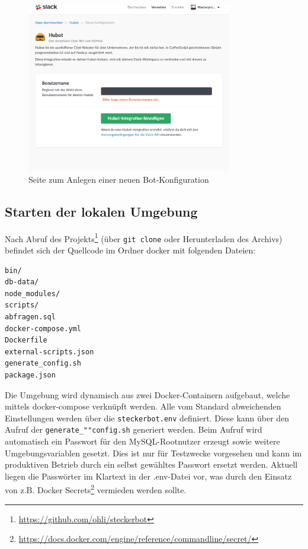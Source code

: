 \begin{figure}[H]
    \centering
    \includegraphics[width=0.8\textwidth]{img/hubot-int.png}
    \caption{Seite zum Anlegen einer neuen Bot-Konfiguration}
    \label{img:hubot-int}
\end{figure}

\subsection{Starten der lokalen Umgebung}
Nach Abruf des Projekts\footnote{\url{https://github.com/ohli/steckerbot}}
(über \texttt{git clone} oder Herunterladen des Archivs) befindet sich der Quellcode im Ordner docker mit folgenden Dateien:

\begin{verbatim}
bin/
db-data/
node_modules/
scripts/
abfragen.sql
docker-compose.yml
Dockerfile
external-scripts.json
generate_config.sh
package.json
\end{verbatim}

Die Umgebung wird dynamisch aus zwei Docker-Containern aufgebaut, welche mittels docker-compose verknüpft werden. Alle vom Standard abweichenden Einstellungen werden über die \texttt{steckerbot.env} definiert. Diese kann über den Aufruf der \texttt{generate\_""config.sh} generiert werden. Beim Aufruf wird automatisch ein Passwort für den MySQL-Rootnutzer erzeugt sowie weitere Umgebungsvariablen gesetzt. Dies ist nur für Testzwecke vorgesehen und kann im produktiven Betrieb durch ein selbst gewähltes Passwort ersetzt werden. Aktuell liegen die Passwörter im Klartext in der .env-Datei vor, was durch den Einsatz von z.B. Docker Secrets\footnote{\url{https://docs.docker.com/engine/reference/commandline/secret/}} vermieden werden sollte.

